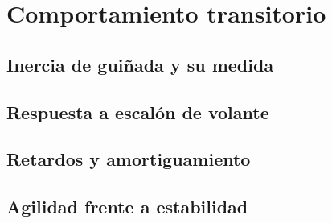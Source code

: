 \chapter{Comportamiento transitorio}
\label{ch:regimen_transitorio}

\begin{objetivos}
  \item {}
  \item {}
  \item {}
\end{objetivos}


\section{Inercia de guiñada y su medida}
\label{sec:regimen_transitorio:01}

\section{Respuesta a escalón de volante}
\label{sec:regimen_transitorio:02}

\section{Retardos y amortiguamiento}
\label{sec:regimen_transitorio:03}

\section{Agilidad frente a estabilidad}
\label{sec:regimen_transitorio:04}


\begin{caso}
\end{caso}

